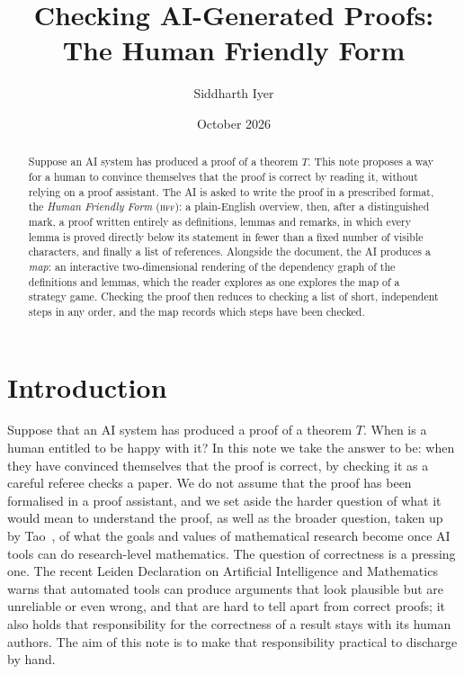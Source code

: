 \documentclass[11pt]{article}
\title{Checking AI-Generated Proofs:\\[0.3em] \large The Human Friendly Form}
\author{Siddharth Iyer}
\date{October 2026}
\theoremstyle{plain}
\theoremstyle{definition}
\theoremstyle{remark}
\theoremstyle{definition}
\theoremstyle{plain}
\theoremstyle{remark}
\newcommand{\HFF}{\textsc{hff}}
\begin{document}
\maketitle

\begin{abstract}
Suppose an AI system has produced a proof of a theorem $T$. This note proposes a way for a human to convince themselves that the proof is correct by reading it, without relying on a proof assistant. The AI is asked to write the proof in a prescribed format, the \emph{Human Friendly Form} (\HFF): a plain-English overview, then, after a distinguished mark, a proof written entirely as definitions, lemmas and remarks, in which every lemma is proved directly below its statement in fewer than a fixed number of visible characters, and finally a list of references. Alongside the document, the AI produces a \emph{map}: an interactive two-dimensional rendering of the dependency graph of the definitions and lemmas, which the reader explores as one explores the map of a strategy game. Checking the proof then reduces to checking a list of short, independent steps in any order, and the map records which steps have been checked.
\end{abstract}

\section{Introduction}

Suppose that an AI system has produced a proof of a theorem $T$. When is a human entitled to be happy with it? In this note we take the answer to be: when they have convinced themselves that the proof is correct, by checking it as a careful referee checks a paper. We do not assume that the proof has been formalised in a proof assistant, and we set aside the harder question of what it would mean to understand the proof, as well as the broader question, taken up by Tao~\cite{Tao}, of what the goals and values of mathematical research become once AI tools can do research-level mathematics. The question of correctness is a pressing one. The recent Leiden Declaration on Artificial Intelligence and Mathematics~\cite{Leiden} warns that automated tools can produce arguments that look plausible but are unreliable or even wrong, and that are hard to tell apart from correct proofs; it also holds that responsibility for the correctness of a result stays with its human authors. The aim of this note is to make that responsibility practical to discharge by hand.
\end{document}
